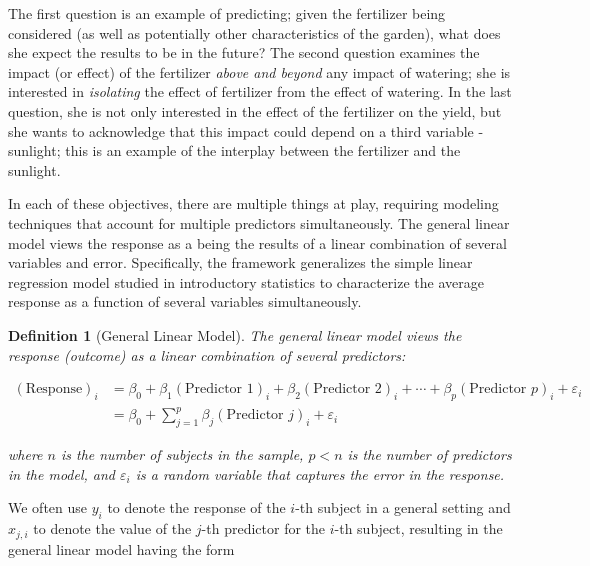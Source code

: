 \documentclass[
]{book}
\theoremstyle{plain}
\theoremstyle{mydefn}
\newtheorem{definition}{Definition}[chapter]
\theoremstyle{myexmpl}
\theoremstyle{remark}
\begin{document}
The first question is an example of predicting; given the fertilizer being considered (as well as potentially other characteristics of the garden), what does she expect the results to be in the future? The second question examines the impact (or effect) of the fertilizer \emph{above and beyond} any impact of watering; she is interested in \emph{isolating} the effect of fertilizer from the effect of watering. In the last question, she is not only interested in the effect of the fertilizer on the yield, but she wants to acknowledge that this impact could depend on a third variable - sunlight; this is an example of the interplay between the fertilizer and the sunlight.

In each of these objectives, there are multiple things at play, requiring modeling techniques that account for multiple predictors simultaneously. The general linear model views the response as a being the results of a linear combination of several variables and error. Specifically, the framework generalizes the simple linear regression model studied in introductory statistics to characterize the average response as a function of several variables simultaneously.

\begin{definition}[General Linear Model]
\protect\hypertarget{def:defn-general-linear-model}{}{\label{def:defn-general-linear-model} {} }The general linear model views the response (outcome) as a linear combination of several predictors:

\[
\begin{aligned}
  (\text{Response})_i 
    &= \beta_0 + \beta_1 (\text{Predictor 1})_{i} + \beta_2 (\text{Predictor 2})_{i} + \dotsb + 
      \beta_p (\text{Predictor } p)_{i} + \varepsilon_i \\
    &= \beta_0 + \sum\limits_{j=1}^{p} \beta_j (\text{Predictor } j)_{i} + \varepsilon_i
\end{aligned}
\]

where \(n\) is the number of subjects in the sample, \(p < n\) is the number of predictors in the model, and \(\varepsilon_i\) is a random variable that captures the error in the response.
\end{definition}

We often use \(y_i\) to denote the response of the \(i\)-th subject in a general setting and \(x_{j,i}\) to denote the value of the \(j\)-th predictor for the \(i\)-th subject, resulting in the general linear model having the form
\end{document}
